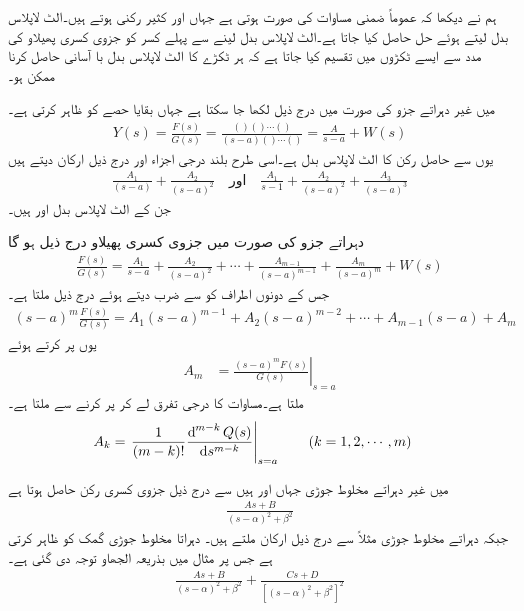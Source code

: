 ہم نے دیکھا کہ عموماً ضمنی مساوات کی صورت  ہوتی ہے جہاں  اور  کثیر رکنی ہوتے ہیں۔الٹ لاپلاس بدل لیتے ہوئے حل  حاصل کیا جاتا ہے۔الٹ لاپلاس بدل لینے سے پہلے کسر کو جزوی کسری پھیلاو کی مدد سے ایسے ٹکڑوں میں تقسیم کیا جاتا ہے کہ ہر ٹکڑے کا الٹ لاپلاس بدل با آسانی حاصل کرنا ممکن ہو۔

 میں غیر دہراتے جزو  کی صورت میں درج ذیل لکھا جا سکتا ہے جہاں  بقایا حصے کو ظاہر کرتی ہے۔
\begin{align}
Y(s)=\frac{F(s)}{G(s)}=\frac{()()\cdots()}{(s-a)()\cdots ()}=\frac{A}{s-a}+W(s)
\end{align}
یوں  سے حاصل رکن  کا الٹ لاپلاس بدل  ہے۔اسی طرح بلند درجی اجزاء  اور  درج ذیل ارکان دیتے ہیں
\begin{align}
\frac{A_1}{(s-a)}+\frac{A_2}{(s-a)^2} \quad \text{اور} \quad \frac{A_1}{s-1}+\frac{A_2}{(s-a)^2}+\frac{A_3}{(s-a)^3}
\end{align} 
جن کے الٹ لاپلاس بدل  اور  ہیں۔

دہراتے جزو  کی صورت میں جزوی کسری پھیلاو درج ذیل ہو گا
\begin{align}
\frac{F(s)}{G(s)}=\frac{A_1}{s-a}+\frac{A_2}{(s-a)^2}+\cdots+\frac{A_{m-1}}{(s-a)^{m-1}}+\frac{A_m}{(s-a)^m}+W(s)
\end{align}
جس کے دونوں اطراف کو  سے ضرب دیتے ہوئے درج ذیل ملتا ہے۔
\begin{align}\label{مساوات_لاپلاس_جزوی_کسری_عمومی_الف}
(s-a)^m\frac{F(s)}{G(s)}=A_1(s-a)^{m-1}+A_2(s-a)^{m-2}+\cdots+A_{m-1}(s-a)+A_m
\end{align}
یوں  پر کرتے ہوئے 
\begin{align}
A_m&=\left. \frac{(s-a)^m F(s)}{G(s)}\right|_{s=a}
\end{align}
ملتا ہے۔مساوات  کا  درجی تفرق لے کر  پر کرنے سے  ملتا ہے۔
\begin{align}
A_k&=\left. \frac{1}{(m-k)!}\frac{\dif^{\, m-k} Q(s)}{\dif s^{m-k}}\right|_{s=a}\quad \quad (k=1,2,\cdots,m)
\end{align}

 میں غیر دہراتے مخلوط جوڑی  جہاں  اور  ہیں سے درج ذیل جزوی کسری رکن حاصل ہوتا ہے
\begin{align*}
\frac{As+B}{(s-\alpha)^2+\beta^2}
\end{align*}
جبکہ دہراتے مخلوط جوڑی مثلاً  سے درج ذیل ارکان ملتے ہیں۔ دہراتا مخلوط جوڑی گمک کو ظاہر کرتی ہے جس پر مثال  میں بذریعہ الجھاو  توجہ دی گئی ہے۔
\begin{align*}
\frac{As+B}{(s-\alpha)^2+\beta^2}+\frac{Cs+D}{[(s-\alpha)^2+\beta^2]^2}
\end{align*}

